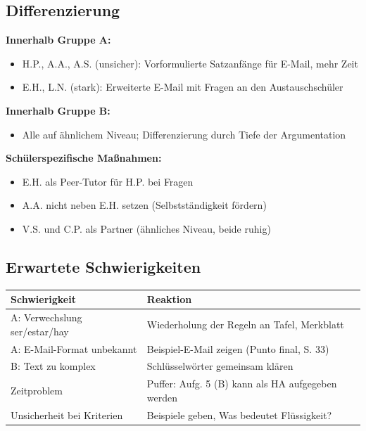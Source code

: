 \documentclass[11pt, a4paper]{article}
\begin{document}
\subsection{Differenzierung}

\textbf{Innerhalb Gruppe A:}
\begin{itemize}[leftmargin=2em]
    \item H.P., A.A., A.S. (unsicher): Vorformulierte Satzanfänge für E-Mail, mehr Zeit
    \item E.H., L.N. (stark): Erweiterte E-Mail mit Fragen an den Austauschschüler
\end{itemize}

\textbf{Innerhalb Gruppe B:}
\begin{itemize}[leftmargin=2em]
    \item Alle auf ähnlichem Niveau; Differenzierung durch Tiefe der Argumentation
\end{itemize}

\textbf{Schülerspezifische Maßnahmen:}
\begin{itemize}[leftmargin=2em]
    \item E.H. als Peer-Tutor für H.P. bei Fragen
    \item A.A. nicht neben E.H. setzen (Selbstständigkeit fördern)
    \item V.S. und C.P. als Partner (ähnliches Niveau, beide ruhig)
\end{itemize}

\subsection{Erwartete Schwierigkeiten}

\begin{center}
\begin{tabular}{|p{5cm}|p{8cm}|}
    \hline
    \textbf{Schwierigkeit} & \textbf{Reaktion} \\
    \hline
    A: Verwechslung ser/estar/hay & Wiederholung der Regeln an Tafel, Merkblatt \\
    \hline
    A: E-Mail-Format unbekannt & Beispiel-E-Mail zeigen (Punto final, S. 33) \\
    \hline
    B: Text zu komplex & Schlüsselwörter gemeinsam klären \\
    \hline
    Zeitproblem & Puffer: Aufg. 5 (B) kann als HA aufgegeben werden \\
    \hline
    Unsicherheit bei Kriterien & Beispiele geben, \glqq{}Was bedeutet Flüssigkeit?\grqq{} \\
    \hline
\end{tabular}
\end{center}
\end{document}
